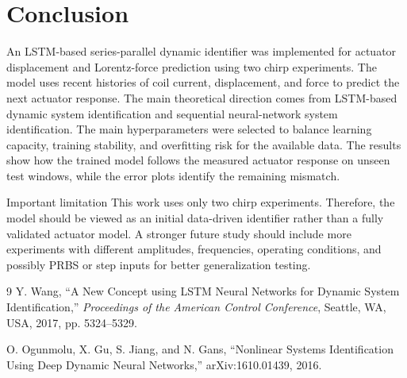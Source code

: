 \documentclass[11pt]{article}
\begin{document}
\section{Conclusion}
An LSTM-based series-parallel dynamic identifier was implemented for actuator displacement and Lorentz-force prediction using two chirp experiments. The model uses recent histories of coil current, displacement, and force to predict the next actuator response. The main theoretical direction comes from LSTM-based dynamic system identification and sequential neural-network system identification. The main hyperparameters were selected to balance learning capacity, training stability, and overfitting risk for the available data. The results show how the trained model follows the measured actuator response on unseen test windows, while the error plots identify the remaining mismatch.

\begin{cautionbox}{Important limitation}
This work uses only two chirp experiments. Therefore, the model should be viewed as an initial data-driven identifier rather than a fully validated actuator model. A stronger future study should include more experiments with different amplitudes, frequencies, operating conditions, and possibly PRBS or step inputs for better generalization testing.
\end{cautionbox}

\begin{thebibliography}{9}
Y. Wang, ``A New Concept using LSTM Neural Networks for Dynamic System Identification,'' \textit{Proceedings of the American Control Conference}, Seattle, WA, USA, 2017, pp. 5324--5329.

O. Ogunmolu, X. Gu, S. Jiang, and N. Gans, ``Nonlinear Systems Identification Using Deep Dynamic Neural Networks,'' arXiv:1610.01439, 2016.
\end{thebibliography}
\end{document}
